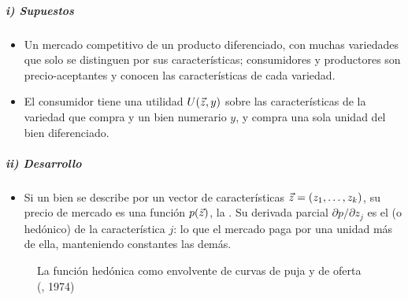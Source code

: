 \documentclass[11pt]{article}
\begin{document}
\subparagraph{i) Supuestos}

\begin{itemize}
\item Un mercado competitivo de un producto diferenciado, con muchas variedades que solo se distinguen por sus características; consumidores y productores son precio-aceptantes y conocen las características de cada variedad.
\item El consumidor tiene una utilidad $U(\vec{z},y)$ sobre las características de la variedad que compra y un bien numerario $y$, y compra una sola unidad del bien diferenciado.
\end{itemize}

\subparagraph{ii) Desarrollo}

\begin{itemize}
\item Si un bien se describe por un vector de características $\vec{z}=(z_1,\dots,z_k)$, su precio de mercado es una función $p(\vec{z})$, la . Su derivada parcial $\partial p/\partial z_j$ es el  (o hedónico) de la característica $j$: lo que el mercado paga por una unidad más de ella, manteniendo constantes las demás.
\end{itemize}

\begin{figure}[H]
\centering
\caption{La función hedónica como envolvente de curvas de puja y de oferta (, 1974)}\label{fig:funcion-hedonica-rosen}
\end{figure}
\end{document}
